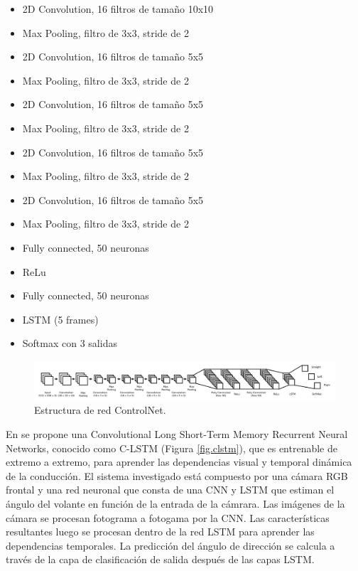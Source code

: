 \begin{itemize}
    \item 2D Convolution, 16 filtros de tamaño 10x10
    \item Max Pooling, filtro de 3x3, stride de 2
    \item 2D Convolution, 16 filtros de tamaño 5x5
    \item Max Pooling, filtro de 3x3, stride de 2
    \item 2D Convolution, 16 filtros de tamaño 5x5
    \item Max Pooling, filtro de 3x3, stride de 2
    \item 2D Convolution, 16 filtros de tamaño 5x5
    \item Max Pooling, filtro de 3x3, stride de 2
    \item 2D Convolution, 16 filtros de tamaño 5x5
    \item Max Pooling, filtro de 3x3, stride de 2
    \item Fully connected, 50 neuronas
    \item ReLu
    \item Fully connected, 50 neuronas
    \item LSTM (5 frames)
    \item Softmax con 3 salidas
\end{itemize}

\begin{figure}
\begin{center}
	\includegraphics[width=1\textwidth]{figures/Estado_arte/controlnet.png}
   \caption{Estructura de red ControlNet.}
	\label{fig.controlnet}
\end{center}
\end{figure}

En \cite{temporal-dependencies} se propone una Convolutional Long Short-Term Memory Recurrent Neural Networks, conocido como C-LSTM (Figura \ref{fig.clstm}), que es entrenable de extremo a extremo, para aprender las dependencias visual y temporal dinámica de la conducción. El sistema investigado está compuesto por una cámara RGB frontal y una red neuronal que consta de una CNN y LSTM que estiman el ángulo del volante en función de la entrada de la cámrara. Las imágenes de la cámara se procesan fotograma a fotogama por la CNN. Las características resultantes luego se procesan dentro de la red LSTM para aprender las dependencias temporales. La predicción del ángulo de dirección se calcula a través de la capa de clasificación de salida después de las capas LSTM.\\

